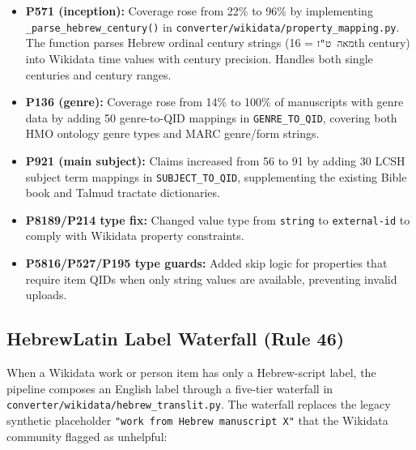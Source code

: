 \documentclass[12pt]{article}
\newcommand{\filepath}[1]{\texttt{\small #1}}
\newcommand{\code}[1]{\texttt{#1}}
\begin{document}
\begin{itemize}
\item \textbf{P571 (inception):} Coverage rose from 22\% to 96\% by implementing \code{\_parse\_hebrew\_century()} in \filepath{converter/wikidata/property\_mapping.py}. The function parses Hebrew ordinal century strings (\code{מאה ט"ז} = 16th century) into Wikidata time values with century precision. Handles both single centuries and century ranges.
\item \textbf{P136 (genre):} Coverage rose from 14\% to 100\% of manuscripts with genre data by adding 50 genre-to-QID mappings in \code{GENRE\_TO\_QID}, covering both HMO ontology genre types and MARC genre/form strings.
\item \textbf{P921 (main subject):} Claims increased from 56 to 91 by adding 30 LCSH subject term mappings in \code{SUBJECT\_TO\_QID}, supplementing the existing Bible book and Talmud tractate dictionaries.
\item \textbf{P8189/P214 type fix:} Changed value type from \code{string} to \code{external-id} to comply with Wikidata property constraints.
\item \textbf{P5816/P527/P195 type guards:} Added skip logic for properties that require item QIDs when only string values are available, preventing invalid uploads.
\end{itemize}

\subsection{Hebrew\textendash Latin Label Waterfall (Rule 46)}
\label{ssec:hebrew-translit-waterfall}

When a Wikidata work or person item has only a Hebrew-script label, the
pipeline composes an English label through a five-tier waterfall in
\filepath{converter/wikidata/hebrew\_translit.py}. The waterfall replaces
the legacy synthetic placeholder \code{"work from Hebrew manuscript X"}
that the Wikidata community flagged as unhelpful:
\end{document}

